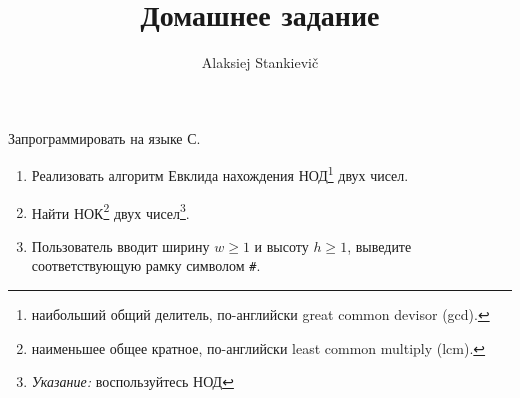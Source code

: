 \documentclass[12pt]{article}
\author{Alaksiej Stankievič}
\title{Домашнее задание}
\begin{document}


 Запрограммировать на языке С.
 \begin{enumerate}
  \item Реализовать алгоритм Евклида нахождения НОД\footnote{наибольший общий делитель, по-английски great common devisor (gcd).} двух чисел.
  \item Найти НОК\footnote{наименьшее общее кратное, по-английски least common multiply (lcm).} двух чисел\footnote{\textit{Указание:} воспользуйтесь НОД}.
  \item Пользователь вводит ширину $w\geq{}1$ и высоту $h\geq{}1$, выведите соответствующую рамку символом \verb|#|.
 \end{enumerate}
\end{document}
